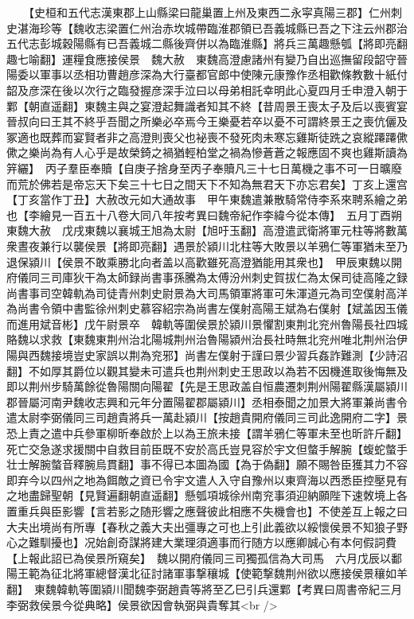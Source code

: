 　　【史桓和五代志漢東郡上山縣梁曰龍巢置上州及東西二永寜真陽三郡】仁州刺史湛海珍等【魏收志梁置仁州治赤坎城帶臨淮郡領已吾義城縣已吾之下注云州郡治五代志彭城穀陽縣有已吾義城二縣後齊併以為臨淮縣】將兵三萬趣懸瓠【將即亮翻趣七喻翻】運糧食應接侯景　魏大赦　東魏高澄慮諸州有變乃自出巡撫留段韶守晉陽委以軍事以丞相功曹趙彦深為大行臺都官郎中使陳元康豫作丞相歡條教數十紙付韶及彦深在後以次行之臨發握彦深手泣曰以母弟相託幸明此心夏四月壬申澄入朝于鄴【朝直遥翻】東魏主與之宴澄起舞識者知其不終【昔周景王喪太子及后以喪賓宴晉叔向曰王其不終乎吾聞之所樂必卒焉今王樂憂若卒以憂不可謂終景王之喪伉儷及冢適也既葬而宴賢者非之高澄則喪父也袐喪不發死肉未寒忘雞斯徒跣之哀縱蹮蹮僛僛之樂尚為有人心乎是故榮錡之禍猶輕柏堂之禍為慘蒼蒼之報應固不爽也雞斯讀為笄纚】　丙子羣臣奉贖【自庚子捨身至丙子奉贖凡三十七日萬機之事不可一日曠廢而荒於佛若是帝忘天下矣三十七日之間天下不知為無君天下亦忘君矣】丁亥上還宫【丁亥當作丁丑】大赦改元如大通故事　甲午東魏遣兼散騎常侍李系來聘系繪之弟也【李繪見一百五十八卷大同八年按考異曰魏帝紀作李緯今從本傳】　五月丁酉朔東魏大赦　戊戌東魏以襄城王旭為太尉【旭吁玉翻】高澄遣武衛將軍元柱等將數萬衆晝夜兼行以襲侯景【將即亮翻】遇景於潁川北柱等大敗景以羊鴉仁等軍猶未至乃退保潁川【侯景不敢乘勝北向者盖以高歡雖死高澄猶能用其衆也】　甲辰東魏以開府儀同三司庫狄干為太師録尚書事孫騰為太傅汾州刺史賀拔仁為太保司徒高隆之録尚書事司空韓軌為司徒青州刺史尉景為大司馬領軍將軍可朱渾道元為司空僕射高洋為尚書令領中書監徐州刺史慕容紹宗為尚書左僕射高陽王斌為右僕射【斌盖因玉儀而進用斌音彬】戊午尉景卒　韓軌等圍侯景於潁川景懼割東荆北兖州魯陽長社四城賂魏以求救【東魏東荆州治北陽城荆州治魯陽潁州治長社時無北兖州唯北荆州治伊陽與西魏接境豈史家誤以荆為兖邪】尚書左僕射于謹曰景少習兵姦詐難測【少詩沼翻】不如厚其爵位以觀其變未可遣兵也荆州刺史王思政以為若不因機進取後悔無及即以荆州步騎萬餘從魯陽關向陽翟【先是王思政盖自恒農遷刺荆州陽翟縣漢屬潁川郡晉屬河南尹魏收志興和元年分置陽翟郡屬潁川】丞相泰聞之加景大將軍兼尚書令遣太尉李弼儀同三司趙貴將兵一萬赴潁川【按趙貴開府儀同三司此逸開府二字】景恐上責之遣中兵參軍柳昕奉啟於上以為王旅未接【謂羊鴉仁等軍未至也昕許斤翻】死亡交急遂求援關中自救目前臣既不安於高氏豈見容於宇文但螫手解腕【蝮蛇螫手壮士解腕螫音釋腕烏貫翻】事不得已本圖為國【為于偽翻】願不賜咎臣獲其力不容即弃今以四州之地為餌敵之資已令宇文遣人入守自豫州以東齊海以西悉臣控壓見有之地盡歸聖朝【見賢遍翻朝直遥翻】懸瓠項城徐州南兖事須迎納願陛下速敇境上各置重兵與臣影響【言若影之随形響之應聲彼此相應不失機會也】不使差互上報之曰大夫出境尚有所專【春秋之義大夫出彊專之可也上引此義欲以綏懷侯景不知狼子野心之難馴擾也】况始創奇謀將建大業理須適事而行随方以應卿誠心有本何假詞費【上報此詔已為侯景所窺矣】　魏以開府儀同三司獨孤信為大司馬　六月戊辰以鄱陽王範為征北將軍總督漢北征討諸軍事撃穰城【使範撃魏荆州欲以應接侯景穰如羊翻】　東魏韓軌等圍潁川聞魏李弼趙貴等將至乙巳引兵還鄴【考異曰周書帝紀三月李弼救侯景今從典略】侯景欲因會執弼與貴奪其<br />
